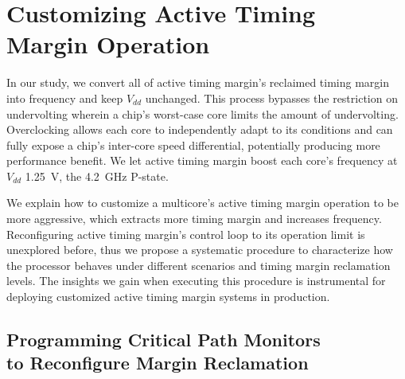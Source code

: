 \section{Customizing Active Timing \\Margin Operation}
\label{sec:process:configurability}

In our study, we convert all of active timing margin's reclaimed timing margin into frequency and keep $V_{dd}$ unchanged. This process bypasses the restriction on undervolting wherein a chip's worst-case core limits the amount of undervolting. Overclocking allows each core to independently adapt to its conditions and can fully expose a chip's inter-core speed differential, potentially producing more performance benefit. We let active timing margin boost each core's frequency at $V_{dd}$ 1.25~V, the 4.2~GHz P-state.

We explain how to customize a multicore's active timing margin operation to be more aggressive, which extracts more timing margin and increases frequency. Reconfiguring active timing margin's control loop to its operation limit is unexplored before, thus we propose a systematic procedure to characterize how the processor behaves under different scenarios and timing margin reclamation levels. The insights we gain when executing this procedure is instrumental for deploying customized active timing margin systems in production.


\subsection{Programming Critical Path Monitors \\to Reconfigure Margin Reclamation}
\label{sec:process:configurability:howto}

